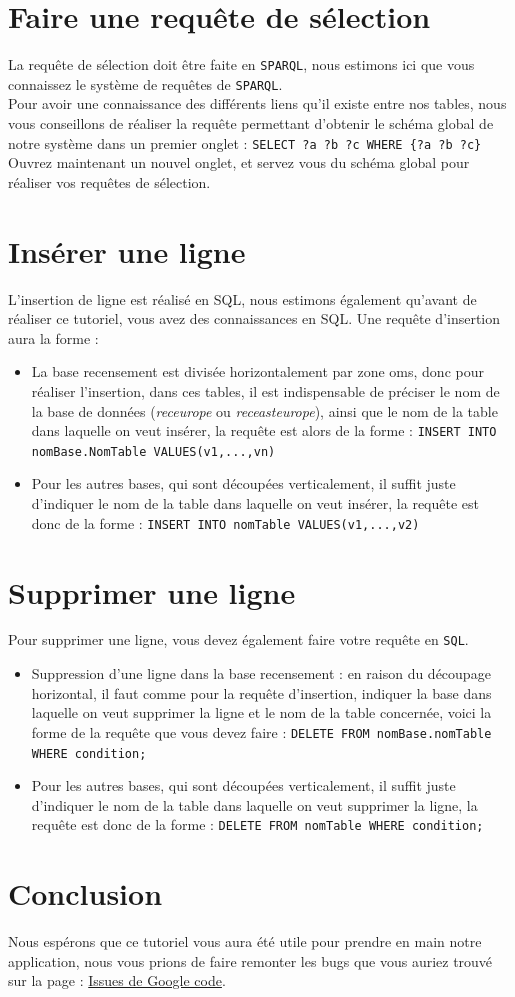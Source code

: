 \documentclass[12pt]{article}
\begin{document}
\section{Faire une requête de sélection}
	La requête de sélection doit être faite en \texttt{SPARQL}, nous estimons ici que vous connaissez le système de requêtes de \texttt{SPARQL}. \\
	\indent Pour avoir une connaissance des différents liens qu'il existe entre nos tables, nous vous conseillons de réaliser la requête permettant d'obtenir le schéma global de notre système dans un premier onglet : \texttt{SELECT ?a ?b ?c WHERE \{?a ?b ?c\} } \\
	\indent Ouvrez maintenant un nouvel onglet, et servez vous du schéma global pour réaliser vos requêtes de sélection.
	
\section{Insérer une ligne}
	L'insertion de ligne est réalisé en SQL, nous estimons également qu'avant de réaliser ce tutoriel, vous avez des connaissances en SQL. Une requête d'insertion aura la forme : 
	\begin{itemize}
	\item La base recensement est divisée horizontalement par zone oms, donc pour réaliser l'insertion, dans ces tables, il est indispensable de préciser le nom de la base de données (\textit{receurope} ou \textit{receasteurope}), ainsi que le nom de la table dans laquelle on veut insérer, la requête est alors de la forme : \texttt{INSERT INTO nomBase.NomTable VALUES(v1,...,vn)}
	\item Pour les autres bases, qui sont découpées verticalement, il suffit juste d'indiquer le nom de la table dans laquelle on veut insérer, la requête est donc de la forme : \texttt{INSERT INTO nomTable VALUES(v1,...,v2)}
	\end{itemize}
		
\section{Supprimer une ligne}
	Pour supprimer une ligne, vous devez également faire votre requête en \texttt{SQL}. 
		\begin{itemize}
	\item Suppression d'une ligne dans la base recensement : en raison du découpage horizontal, il faut comme pour la requête d'insertion, indiquer la base dans laquelle on veut supprimer la ligne et le nom de la table concernée, voici la forme de la requête que vous devez faire : \texttt{DELETE FROM nomBase.nomTable WHERE condition;}
	\item Pour les autres bases, qui sont découpées verticalement, il suffit juste d'indiquer le nom de la table dans laquelle on veut supprimer la ligne, la requête est donc de la forme : \texttt{DELETE FROM nomTable WHERE condition;}
	\end{itemize}
	
\section{Conclusion}
	Nous espérons que ce tutoriel vous aura été utile pour prendre en main notre application, nous vous prions de faire remonter les bugs que vous auriez trouvé sur la page : \href{https://code.google.com/p/raja/issues/list}{Issues de Google code}.
\end{document}
